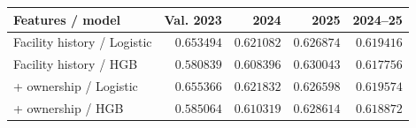 \begin{tabularx}{\linewidth}{@{}Xrrrr@{}}
\toprule
Features / model & Val. 2023 & 2024 & 2025 & 2024--25 \\
\midrule
Facility history / Logistic & $0.653494$ & $0.621082$ & $0.626874$ & $0.619416$ \\
Facility history / HGB & $0.580839$ & $0.608396$ & $0.630043$ & $0.617756$ \\
+ ownership / Logistic & $0.655366$ & $0.621832$ & $0.626598$ & $0.619574$ \\
+ ownership / HGB & $0.585064$ & $0.610319$ & $0.628614$ & $0.618872$ \\
\bottomrule
\end{tabularx}
